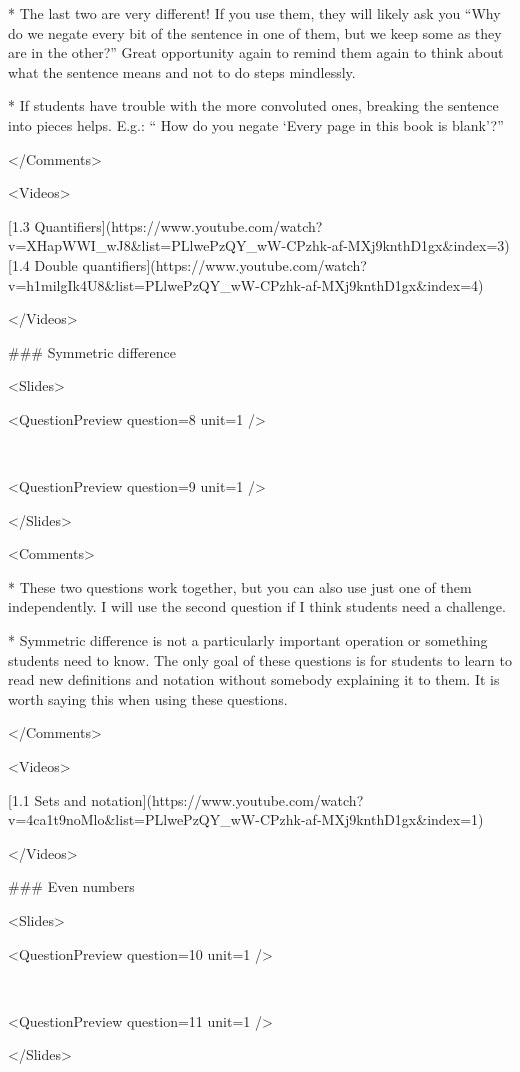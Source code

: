 *   The last two are very different! If you use them, they will likely ask you “Why do we negate every bit of the sentence in one of them, but we keep some as they are in the other?” Great opportunity again to remind them again to think about what the sentence means and not to do steps mindlessly.

*   If students have trouble with the more convoluted ones, breaking the sentence into pieces helps. E.g.: “ How do you negate ‘Every page in this book is blank’?”

</Comments>

<Videos>

[1.3 Quantifiers](https://www.youtube.com/watch?v=XHapWWI_wJ8\&list=PLlwePzQY_wW-CPzhk-af-MXj9knthD1gx\&index=3)[1.4 Double quantifiers](https://www.youtube.com/watch?v=h1milgIk4U8\&list=PLlwePzQY_wW-CPzhk-af-MXj9knthD1gx\&index=4)

</Videos>

### Symmetric difference

<Slides>

<QuestionPreview question={8} unit={1} />

 

<QuestionPreview question={9} unit={1} />

</Slides>

<Comments>

*   These two questions work together, but you can also use just one of them independently. I will use the second question if I think students need a challenge.

*   Symmetric difference is not a particularly important operation or something students need to know. The only goal of these questions is for students to learn to read new definitions and notation without somebody explaining it to them. It is worth saying this when using these questions.

</Comments>

<Videos>

[1.1 Sets and notation](https://www.youtube.com/watch?v=4ca1t9noMlo\&list=PLlwePzQY_wW-CPzhk-af-MXj9knthD1gx\&index=1)

</Videos>

### Even numbers

<Slides>

<QuestionPreview question={10} unit={1} />

 

<QuestionPreview question={11} unit={1} />

</Slides>


